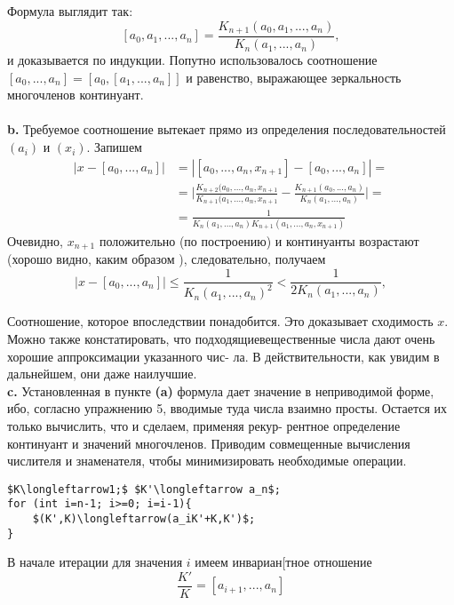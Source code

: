 \documentclass{mai_book}
\begin{document}
\noindent Формула выглядит так:
$$[a_0,a_1,...,a_n]=\frac{K_{n+1}(a_0,a_1,...,a_n)}{K_n(a_1,...,a_n)},$$
и доказывается по индукции. Попутно использовалось соотношение\linebreak
$[a_0,...,a_n]=[a_0,[a_1,...,a_n]]$ и равенство, выражающее зеркальность\linebreak
многочленов континуант.\\
\\
\hspace*{15pt}\textbf{b.} Требуемое соотношение вытекает прямо из определения \linebreak
последовательностей $(a_i)$ и $(x_i)$. Запишем
\begin{equation}
	\begin{split}
		|x-[a_0,...,a_n]|&=|[a_0,...,a_n,x_{n+1}]-[a_0,...,a_n]|=\\
		&=\bigg|\frac{ K_{n+2}(a_0,...,a_n,x_{n+1} }{ K_{n+1}(a_1,...,a_n,x_{n+1} }
		-\frac{ K_{n+1}(a_0,...,a_n) }{K_n(a_1,...,a_n)} \bigg|= \\
		&=\frac{1}{ K_n(a_1,...,a_n)K_{n+1}(a_1,...,a_n,x_{n+1}) }
	\end{split}
\end{equation}
Очевидно, $x_{n+1}$ положительно (по построению) и континуанты возра­стают\linebreak
(хорошо видно, каким образом ), следовательно, получаем
\begin{equation}
	\big|x-[a_0,...,a_n]\big|\leqslant \frac{1}{K_n(a_1,...,a_n)^2}<\frac{1}{2K_n(a_1,...,a_n)},
\end{equation}

\noindent Соотношение, которое впоследствии понадобится. Это доказывает\linebreak 
схо­димость $x$. Можно также констатировать, что подходящие\linebreak веществен­ные числа дают очень хорошие аппроксимации указанного чис-\linebreak
ла. В действительности, как увидим в дальнейшем, они даже наилучшие.\newline
\\
\hspace*{15pt}\textbf{c.} Установленная в пункте \textbf{(a)} формула дает значение в неприводи­мой\linebreak 
форме, ибо, согласно упражнению 5, вводимые туда числа взаимно\linebreak
просты. Остается их только вычислить, что и сделаем, применяя рекур­-\linebreak
рентное определение континуант и значений многочленов. Приводим\linebreak
совмещенные вычисления числителя и знаменателя, чтобы\linebreak 
минимизи­ровать необходимые операции.
\begin{lstlisting}[mathescape=true]
$K\longleftarrow1;$ $K'\longleftarrow a_n$;
for (int i=n-1; i>=0; i=i-1){
	$(K',K)\longleftarrow(a_iK'+K,K')$;
}
\end{lstlisting}
В начале итерации для значения $i$ имеем инвариан[тное отношение
$$ \frac{K'}{K}=[a_{i+1},...,a_n] $$
\newpage
\end{document}
